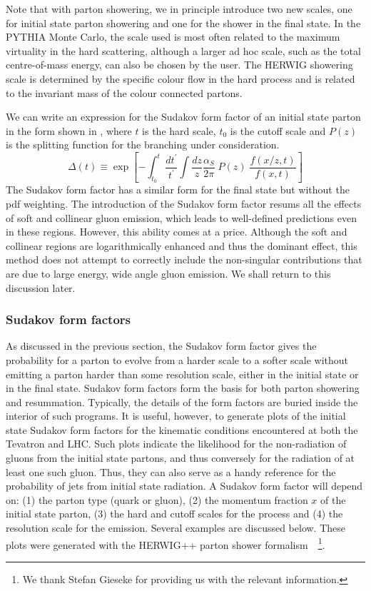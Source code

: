 \documentclass[12pt]{iopart}
\def\as{\alpha_S}
\begin{document}
Note that with parton showering, we in principle introduce two new scales, one for initial state parton
showering and one for the shower in the final state. In the PYTHIA Monte Carlo, the scale used is most often
related to the maximum virtuality in the hard scattering, although a larger ad hoc scale, such as the total
centre-of-mass energy, can also be chosen by the user. The HERWIG showering scale is determined by the specific colour
flow in the hard process and is related to the invariant mass of the colour connected partons.

We can write an expression for the Sudakov form factor of an initial state parton in the form shown in
, where $t$ is the hard scale, $t_0$ is the cutoff scale and $P(z)$ is the
splitting function for the branching under consideration. 
\begin{equation}
\Delta(t) \equiv \exp \left[ - \int_{t_0}^t \frac{dt^\prime}{t^\prime}
 \int \frac{dz}{z} \frac{\as}{2\pi} \; P(z) \;
 \frac{f(x/z,t)}{f(x,t)} \right]
\label{eq:sudakov}
\end{equation}
The Sudakov form factor has a similar form for the final state but without the pdf weighting.  The introduction of
the Sudakov form factor resums all the effects of soft and collinear gluon emission, which leads to well-defined
predictions even in these regions. However, this ability comes at a price. Although the soft and collinear regions
are logarithmically enhanced and thus the dominant effect, this method does not attempt to correctly include the
non-singular contributions that are due to large energy, wide angle gluon emission.
We shall return to this discussion later.


\subsubsection{Sudakov form factors}
\label{sec:sudakov}

As discussed in the previous section, the Sudakov form factor gives the probability for a parton to evolve from a
harder scale to a softer scale without emitting a parton harder than some resolution scale, either in the initial
state or in the final state. Sudakov form factors form the basis for both  parton showering and resummation.
Typically, the details of the form factors are buried inside the interior of such programs. It is useful, however,
to generate plots  of  the initial state Sudakov form factors for the kinematic conditions encountered at both the
Tevatron  and LHC. Such plots  indicate  the likelihood for the non-radiation of gluons from the initial state
partons, and thus conversely for  the radiation of at least one such gluon. Thus, they can also serve as a handy
reference for the probability of jets from initial state radiation. A Sudakov form factor will depend on: (1) the
parton type (quark or gluon), (2)  the momentum fraction $x$ of the  initial state parton, (3) the hard and cutoff
scales for the process and (4) the resolution scale for the emission. Several examples are discussed below. These
plots were generated with the HERWIG++ parton shower
formalism~\cite{Gieseke:2004tc}~\footnote{We thank Stefan Gieseke for providing us with the relevant information.}. 
\end{document}
